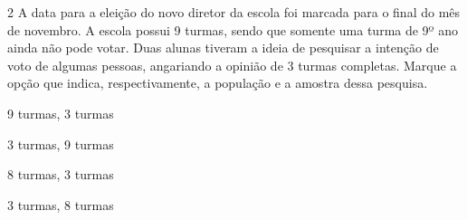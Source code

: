 

\num{2} A data para a eleição do novo diretor da escola foi marcada para o
final do mês de novembro. A escola possui 9 turmas, sendo que somente
uma turma de 9º ano ainda não pode votar. Duas alunas tiveram a ideia de
pesquisar a intenção de voto de algumas pessoas, angariando a opinião de
3 turmas completas. Marque a opção que indica, respectivamente, a
população e a amostra dessa pesquisa.

\begin{escolha}
\item 9 turmas, 3 turmas
\item 3 turmas, 9 turmas
\item 8 turmas, 3 turmas
\item 3 turmas, 8 turmas
\end{escolha}




